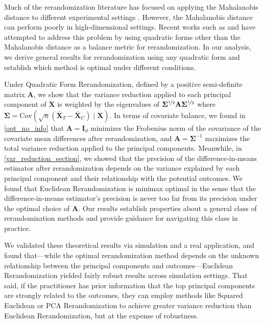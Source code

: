 \documentclass[11pt,twoside]{article}
\theoremstyle{definition}
\theoremstyle{remark}
\begin{document}
Much of the rerandomization literature has focused on applying the Mahalanobis distance to different experimental settings \citep{morgan2012rerandomization, morgan2015rerandomization, branson2016improving, li2018asymptotic, zhou2018sequential, lu2023design}. However, the Mahalanobis distance can perform poorly in high-dimensional settings. Recent works such as \cite{branson2021ridge} and \cite{zhang2023pca} have attempted to address this problem by using quadratic forms other than the Mahalanobis distance as a balance metric for rerandomization. In our analysis, we derive general results for rerandomization using any quadratic form and establish which method is optimal under different conditions.


Under Quadratic Form Rerandomization, defined by a positive semi-definite matrix $\mathbf{A}$, we show that the variance reduction applied to each principal component of $\mathbf{X}$ is weighted by the eigenvalues of $\mathbf{\Sigma}^{\nicefrac{1}{2}} \mathbf{A} \mathbf{\Sigma}^{\nicefrac{1}{2}}$ where $\mathbf{\Sigma} = \text{Cov}(\sqrt{n}(\bar{\mathbf{X}}_T - \bar{\mathbf{X}}_C) \mid \mathbf{X})$. In terms of covariate balance, we found in \cref{opt_no_info} that $\mathbf{A} = \mathbf{I}_d$ minimizes the Frobenius norm of the covariance of the covariate mean differences after rerandomization, and $\mathbf{A} = \mathbf{\Sigma}^{-1}$ maximizes the total variance reduction applied to the principal components. Meanwhile, in \cref{var_reduction_section}, we showed that the precision of the difference-in-means estimator after rerandomization depends on the variance explained by each principal component and their relationship with the potential outcomes. We found that Euclidean Rerandomization is minimax optimal in the sense that the difference-in-means estimator's precision is never too far from its precision under the optimal choice of $\mathbf{A}$. Our results establish properties about a general class of rerandomization methods and provide guidance for navigating this class in practice.

We validated these theoretical results via simulation and a real application, and found that---while the optimal rerandomization method depends on the unknown relationship between the principal components and outcomes---Euclidean Rerandomization yielded fairly robust results across simulation settings. That said, if the practitioner has prior information that the top principal components are strongly related to the outcomes, they can employ methods like Squared Euclidean or PCA Rerandomization to achieve greater variance reduction than Euclidean Rerandomization, but at the expense of robustness.
\end{document}
